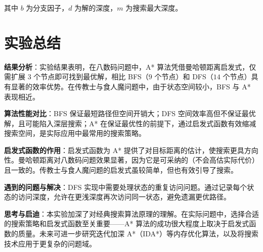 \documentclass[UTF8]{ctexart}
\begin{document}
其中 $b$ 为分支因子，$d$ 为解的深度，$m$ 为搜索最大深度。

\section{实验总结}

\textbf{结果分析}：实验结果表明，在八数码问题中，A* 算法凭借曼哈顿距离启发式，仅需扩展 $3$ 个节点即可找到最优解，相比 BFS（$9$ 个节点）和 DFS（$14$ 个节点）具有显著的效率优势。在传教士与食人魔问题中，由于状态空间较小，BFS 与 A* 表现相近。

\textbf{算法性能对比}：BFS 保证最短路径但空间开销大；DFS 空间效率高但不保证最优解，且可能陷入深层搜索；A* 在保证最优性的前提下，通过启发式函数有效缩减搜索空间，是实际应用中最常用的搜索策略。

\textbf{启发式函数的作用}：启发式函数为 A* 提供了对目标距离的估计，使搜索更具方向性。曼哈顿距离对八数码问题效果显著，因为它是可采纳的（不会高估实际代价）且一致的。传教士与食人魔问题的启发式虽较简单，但也有效引导了搜索。

\textbf{遇到的问题与解决}：DFS 实现中需要处理状态的重复访问问题。通过记录每个状态的访问深度，允许在更浅深度再次访问同一状态，避免遗漏更优路径。

\textbf{思考与启迪}：本实验加深了对经典搜索算法原理的理解。在实际问题中，选择合适的搜索策略和启发式函数至关重要——A* 算法的成功很大程度上取决于启发式函数的质量。未来可进一步研究迭代加深 A*（IDA*）等内存优化算法，以及将搜索技术应用于更复杂的问题域。
\end{document}
